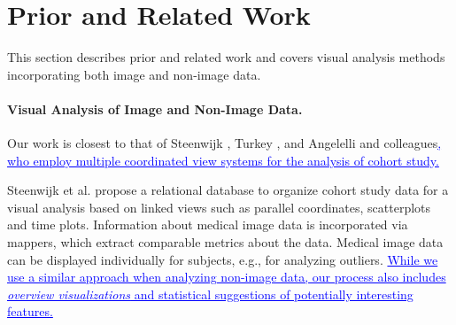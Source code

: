 \documentclass[journal]{style/vgtc} 			          %
\newcommand{\add}[1]{\textcolor{blue}{\uline{#1}}}
\begin{document}
\section{Prior and Related Work}

This section describes prior and related work and covers visual analysis 
methods incorporating both image and non-image data. 

\paragraph{Visual Analysis of Image and Non-Image Data.}

Our work is closest to that of Steenwijk \cite{Steenwijk2010}, Turkey \cite{Turkay2013}, and Angelelli \cite{Angelelli2014} and colleagues\add{, who employ multiple coordinated view systems for the analysis of cohort study.}
%

Steenwijk et al. \cite{Steenwijk2010} propose a relational database to organize cohort study data for a visual analysis based on linked views such as parallel coordinates, scatterplots and time plots.
%
Information about medical image data is incorporated via mappers, which extract comparable metrics about the data.
%
Medical image data can be displayed individually for subjects, e.g., for analyzing outliers.
%
\add{While we use a similar approach when analyzing non-image data, our process also includes \emph{overview visualizations} and statistical suggestions of potentially interesting features.}
%
\end{document}
